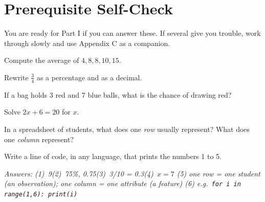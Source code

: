 \section*{Prerequisite Self-Check}

You are ready for Part I if you can answer these. If several give you trouble,
work through  slowly and use Appendix C as a companion.

\begin{tightnum}
  \item Compute the average of $4, 8, 8, 10, 15$.
  \item Rewrite $\frac{3}{4}$ as a percentage and as a decimal.
  \item If a bag holds 3 red and 7 blue balls, what is the chance of drawing red?
  \item Solve $2x + 6 = 20$ for $x$.
  \item In a spreadsheet of students, what does one \emph{row} usually represent?
        What does one \emph{column} represent?
  \item Write a line of code, in any language, that prints the numbers 1 to 5.
\end{tightnum}

\smallskip
\textit{Answers: (1)~9\quad (2)~75\%, 0.75\quad (3)~3/10 = 0.3\quad (4)~$x=7$\quad
(5) one row = one student (an observation); one column = one attribute (a feature)\quad
(6) e.g.\ \texttt{for i in range(1,6): print(i)}}

\newpage
\tableofcontents
\newpage
\listoffigures
{}
\newpage

\setcounter{page}{1}
